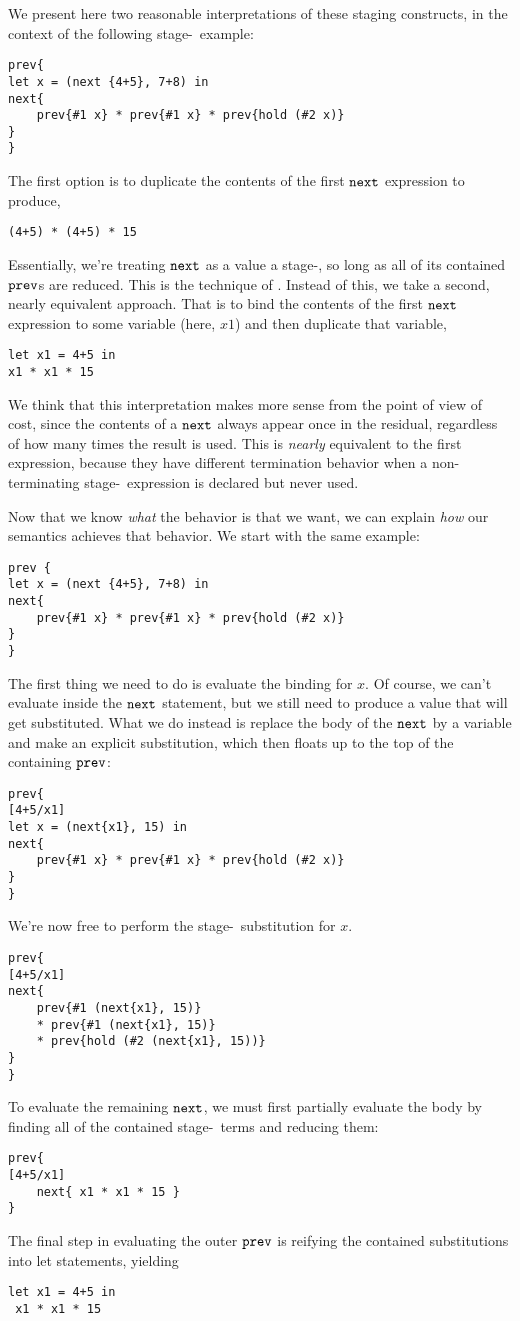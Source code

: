 We present here two reasonable interpretations of these staging constructs, 
in the context of the following stage-\bbtwo~example:
\begin{lstlisting} 
prev{
let x = (next {4+5}, 7+8) in
next{
	prev{#1 x} * prev{#1 x} * prev{hold (#2 x)}
}
}
\end{lstlisting}
The first option is to duplicate the contents of the first ${\tt next}$ expression to produce,
\begin{lstlisting}
(4+5) * (4+5) * 15
\end{lstlisting}
Essentially, we're treating ${\tt next}$ as a value a stage-\bbone, so long as all of its contained ${\tt prev}$s are reduced.  
This is the technique of \cite{davies96}.
Instead of this, we take a second, nearly equivalent approach.  
That is to bind the contents of the first ${\tt next}$ expression to some variable (here, $x1$) and then duplicate that variable,
\begin{lstlisting} 
let x1 = 4+5 in
x1 * x1 * 15
\end{lstlisting}

We think that this interpretation makes more sense from the point of view of cost, 
since the contents of a ${\tt next}$ always appear once in the residual, regardless of how many times the result is used.  
This is {\em nearly} equivalent to the first expression, because they have different termination behavior 
when a non-terminating stage-\bbtwo~expression is declared but never used.

Now that we know {\em what} the behavior is that we want, we can explain {\em how} our semantics achieves that behavior.  We start with the same example:
\begin{lstlisting}
prev {
let x = (next {4+5}, 7+8) in
next{
	prev{#1 x} * prev{#1 x} * prev{hold (#2 x)}
}
}
\end{lstlisting}
The first thing we need to do is evaluate the binding for $x$.  Of course, we can't evaluate inside the ${\tt next}$ statement, but we still need to produce a value that will get substituted.  What we do instead is replace the body of the ${\tt next}$ by a variable and make an explicit substitution, which then floats up to the top of the containing ${\tt prev}$:
\begin{lstlisting} 
prev{
[4+5/x1]
let x = (next{x1}, 15) in
next{
	prev{#1 x} * prev{#1 x} * prev{hold (#2 x)}
}
}
\end{lstlisting}
We're now free to perform the stage-\bbone~substitution for $x$.  
\begin{lstlisting} 
prev{
[4+5/x1]
next{
	prev{#1 (next{x1}, 15)} 
	* prev{#1 (next{x1}, 15)} 
	* prev{hold (#2 (next{x1}, 15))}
}
}
\end{lstlisting}
To evaluate the remaining ${\tt next}$, we must first partially evaluate the body by finding all of the contained stage-\bbone~terms and reducing them:
\begin{lstlisting} 
prev{
[4+5/x1]
	next{ x1 * x1 * 15 }
}
\end{lstlisting}
The final step in evaluating the outer ${\tt prev}$ is reifying the contained substitutions into let statements, yielding
\begin{lstlisting} 
let x1 = 4+5 in
 x1 * x1 * 15
\end{lstlisting}

